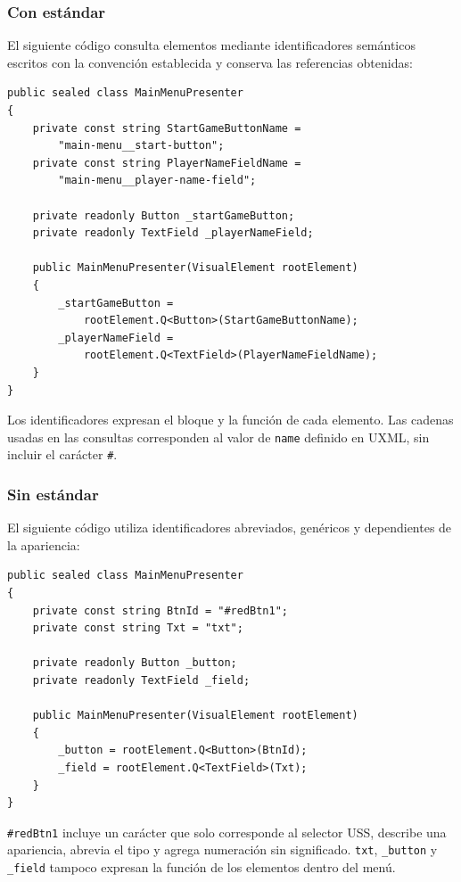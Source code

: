 \newpage

\subsubsection{Con estándar}

El siguiente código consulta elementos mediante identificadores semánticos escritos con la convención establecida y conserva las referencias obtenidas:

\begin{lstlisting}[style=csharpstyle]
public sealed class MainMenuPresenter
{
    private const string StartGameButtonName =
        "main-menu__start-button";
    private const string PlayerNameFieldName =
        "main-menu__player-name-field";

    private readonly Button _startGameButton;
    private readonly TextField _playerNameField;

    public MainMenuPresenter(VisualElement rootElement)
    {
        _startGameButton =
            rootElement.Q<Button>(StartGameButtonName);
        _playerNameField =
            rootElement.Q<TextField>(PlayerNameFieldName);
    }
}
\end{lstlisting}

Los identificadores expresan el bloque y la función de cada elemento. Las cadenas usadas en las consultas corresponden al valor de \texttt{name} definido en UXML, sin incluir el carácter \texttt{\#}.

\newpage

\subsubsection{Sin estándar}

El siguiente código utiliza identificadores abreviados, genéricos y dependientes de la apariencia:

\begin{lstlisting}[style=csharpstyle]
public sealed class MainMenuPresenter
{
    private const string BtnId = "#redBtn1";
    private const string Txt = "txt";

    private readonly Button _button;
    private readonly TextField _field;

    public MainMenuPresenter(VisualElement rootElement)
    {
        _button = rootElement.Q<Button>(BtnId);
        _field = rootElement.Q<TextField>(Txt);
    }
}
\end{lstlisting}

\texttt{\#redBtn1} incluye un carácter que solo corresponde al selector USS, describe una apariencia, abrevia el tipo y agrega numeración sin significado. \texttt{txt}, \texttt{\_button} y \texttt{\_field} tampoco expresan la función de los elementos dentro del menú.
